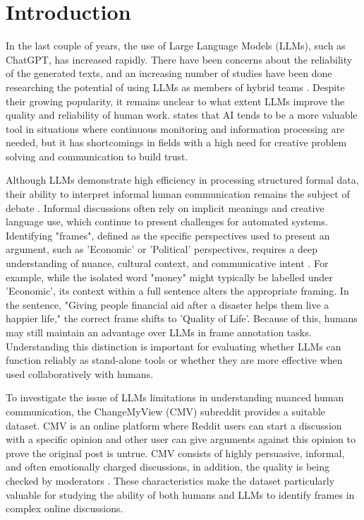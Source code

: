 \documentclass[
10pt, %
a4paper, %
oneside, %
headinclude,footinclude, %
] {book}%
\begin{document}
\chapter{Introduction}
In the last couple of years, the use of Large Language Models (LLMs), such as ChatGPT, has increased rapidly. There have been concerns about the reliability of the generated texts, and an increasing number of studies have been done researching the potential of using LLMs as members of hybrid teams \citep{richter2024hybrid}. Despite their growing popularity, it remains unclear to what extent LLMs improve the quality and reliability of human work. \cite{wilkens2020artificial} states that AI tends to be a more valuable tool in situations where continuous monitoring and information processing are needed, but it has shortcomings in fields with a high need for creative problem solving and communication to build trust. 

Although LLMs demonstrate high efficiency in processing structured formal data, their ability to interpret informal human communication remains the subject of debate \citep{wilkens2020artificial}. Informal discussions often rely on implicit meanings and creative language use, which continue to present challenges for automated systems. Identifying "frames", defined as the specific perspectives used to present an argument, such as 'Economic' or 'Political' perspectives, requires a deep understanding of nuance, cultural context, and communicative intent \citep{card2015media}. For example, while the isolated word "money" might typically be labelled under 'Economic', its context within a full sentence alters the appropriate framing. In the sentence, "Giving people financial aid after a disaster helps them live a happier life," the correct frame shifts to 'Quality of Life'. Because of this, humans may still maintain an advantage over LLMs in frame annotation tasks. Understanding this distinction is important for evaluating whether LLMs can function reliably as stand-alone tools or whether they are more effective when used collaboratively with humans. 

To investigate the issue of LLMs limitations in understanding nuanced human communication, the ChangeMyView (CMV) subreddit provides a suitable dataset.  CMV is an online platform where Reddit users can start a discussion with a specific opinion and other user can give arguments against this opinion to prove the original post is untrue. CMV consists of highly persuasive, informal, and often emotionally charged discussions, in addition, the quality is being checked by moderators \citep{tan2016winning}. These characteristics make the dataset particularly valuable for studying the ability of both humans and LLMs to identify frames in complex online discussions. 
\end{document}
